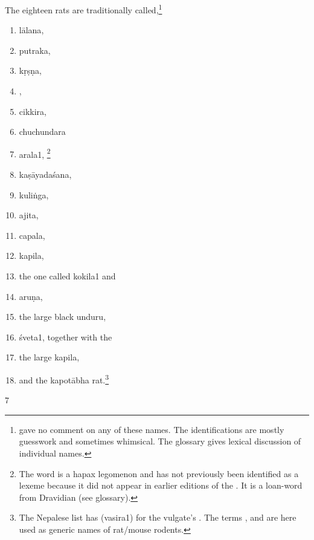 \begin{translation}
    The eighteen rats are traditionally called,\footnote{ 
    gave no 
    comment on any of these names.  The identifications are 
    mostly guesswork and sometimes whimsical.  The glossary gives lexical 
    discussion of individual names.}
\begin{multicols}{2}
    \begin{enumerate}
        \item \Gls{lālana},
        \item \Gls{putraka},
        \item \Gls{kṛṣṇa},
        \item {},
        \item \Gls{cikkira}, %
        \item \Gls{chuchundara} %
        \item \Gls{arala1},%
\footnote{The word  is a hapax legomenon and has not 
previously been identified as a lexeme because it did not appear in earlier 
editions of the \SS.  It is a loan-word from Dravidian (see glossary).}        
        \item \Gls{kaṣāyadaśana},
        \item \Gls{kuliṅga},
        \item \Gls{ajita},
        \item \Gls{capala},
        \item \Gls{kapila},
        \item the one called \Gls{kokila1} and 
        \item \Gls{aruṇa},
        \item the large black \Gls{unduru}, 
        \item \Gls{śveta1}, together with the
        \item the large \Gls{kapila},
        \item and the \Gls{kapotābha} rat.\footnote{The Nepalese list has 
         (\Gls{vasira1}) for the 
        vulgate's .  The terms ,  and 
         are here used as generic names of rat/mouse rodents.}
\end{enumerate}
    \end{multicols}
\medskip
    
\item[7]


\end{translation}
